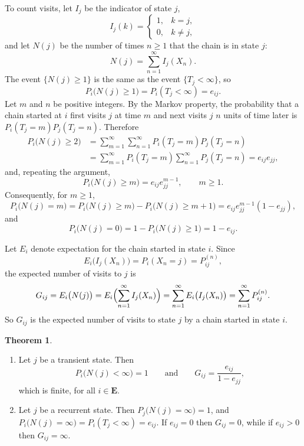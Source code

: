 \documentclass[11pt,a4paper]{article}
\theoremstyle{definition}
\newtheorem{thm}{Theorem}[subsection]
\begin{document}
To count visits, let $I_j$ be the indicator of state $j$,
\[
I_j(k) = \begin{cases} 1 , & k = j , \\ 0 , & k \ne j , \end{cases}
\]
and let $N(j)$ be the number of times $n \ge 1$ that the chain is in state $j$:
\[
N(j) = \sum_{n=1}^\infty I_j(X_n) .
\]
The event $\{N(j) \ge 1\}$ is the same as the event $\{T_j < \infty\}$, so
\[
P_i\bigl(N(j) \ge 1\bigr) = P_i(T_j < \infty) = e_{ij} .
\]
Let $m$ and $n$ be positive integers. By the Markov property, the probability that a chain started at $i$ first visits $j$ at time $m$ and next visits $j$
$n$ units of time later is $P_i(T_j = m)P_j(T_j = n)$. Therefore
\begin{align*}
P_i\bigl(N(j) \ge 2\bigr) &= \sum_{m=1}^\infty\sum_{n=1}^\infty P_i(T_j = m)P_j(T_j = n) \\
&= \sum_{m=1}^\infty P_i(T_j = m)\sum_{n=1}^\infty P_j(T_j = n) = e_{ij}e_{jj} ,
\end{align*}
and, repeating the argument,
\[
P_i\bigl(N(j) \ge m\bigr) = e_{ij}e_{jj}^{m-1} , \qquad m \ge 1 .
\]
Consequently, for $m \ge 1$,
\[
P_i\bigl(N(j) = m\bigr) = P_i\bigl(N(j) \ge m\bigr) - P_i\bigl(N(j) \ge m + 1\bigr) = e_{ij}e_{jj}^{m-1}(1 - e_{jj}) ,
\]
and
\[
P_i\bigl(N(j) = 0\bigr) = 1 - P_i\bigl(N(j) \ge 1\bigr) = 1 - e_{ij} .
\]

Let $E_i$ denote expectation for the chain started in state $i$. Since
\[
E_i\bigl(I_j(X_n)\bigr) = P_i(X_n = j) = P^{(n)}_{ij} ,
\]
the expected number of visits to $j$ is
\[
G_{ij} = E_i\bigl(N(j)\bigr) = E_i\Bigl(\sum_{n=1}^\infty I_j(X_n)\Bigr) = \sum_{n=1}^\infty E_i\bigl(I_j(X_n)\bigr) = \sum_{n=1}^\infty P^{(n)}_{ij} .
\]
So $G_{ij}$ is the expected number of visits to state $j$ by a chain started in state $i$.

\begin{thm}
\begin{enumerate}[label=(\roman*)]
\item Let $j$ be a transient state. Then
\[
P_i\bigl(N(j) < \infty\bigr) = 1 \qquad\text{and}\qquad G_{ij} = \frac{e_{ij}}{1 - e_{jj}} ,
\]
which is finite, for all $i \in \mathbf E$.
\item Let $j$ be a recurrent state. Then $P_j\bigl(N(j) = \infty\bigr) = 1$, and $P_i\bigl(N(j) = \infty\bigr) = P_i(T_j < \infty) = e_{ij}$. If $e_{ij} = 0$ then
$G_{ij} = 0$, while if $e_{ij} > 0$ then $G_{ij} = \infty$.
\end{enumerate}
\end{thm}
\end{document}

